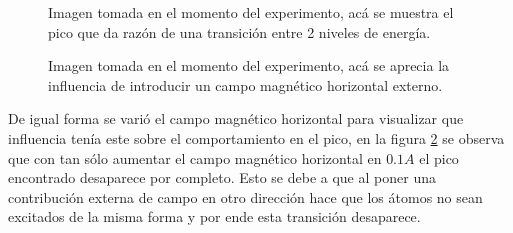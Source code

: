 \documentclass[%
 reprint,
 amsmath,amssymb,
 aps,
]{revtex4-1}
\begin{document}
\begin{figure}[h]
\caption{\label{foto pico} Imagen tomada en el momento del experimento, acá se muestra el pico que da razón de una transición entre 2 niveles de energía.}
\end{figure}
\begin{figure}[h]
\caption{\label{foto muerto}  Imagen tomada en el momento del experimento, acá se aprecia la influencia de introducir un campo magnético horizontal externo.}
\end{figure}
De igual forma se varió el campo magnético horizontal para visualizar que influencia tenía este sobre el comportamiento en el pico, en la figura \ref{foto muerto} se observa que con tan sólo aumentar el campo magnético horizontal en $0.1 A$ el pico encontrado desaparece por completo. Esto se debe a que al poner una contribución externa de campo en otro dirección hace que los átomos no sean excitados de la misma forma y por ende esta transición desaparece.
\end{document}
